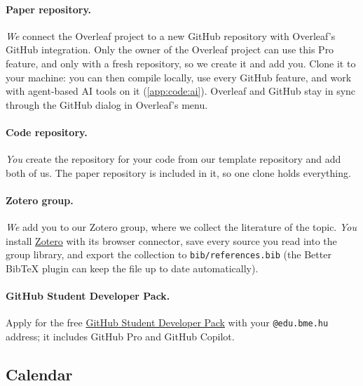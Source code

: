 \paragraph{Paper repository.} \emph{We} connect the Overleaf project to a new GitHub repository with Overleaf's GitHub integration. Only the owner of the Overleaf project can use this Pro feature, and only with a fresh repository, so we create it and add you. Clone it to your machine: you can then compile locally, use every GitHub feature, and work with agent-based AI tools on it (\cref{app:code:ai}). Overleaf and GitHub stay in sync through the GitHub dialog in Overleaf's menu.

\paragraph{Code repository.} \emph{You} create the repository for your code from our template repository and add both of us. The paper repository is included in it, so one clone holds everything.

\paragraph{Zotero group.} \emph{We} add you to our Zotero group, where we collect the literature of the topic. \emph{You} install \href{https://www.zotero.org/}{Zotero} with its browser connector, save every source you read into the group library, and export the collection to \texttt{bib/references.bib} (the Better BibTeX plugin can keep the file up to date automatically).

\paragraph{GitHub Student Developer Pack.} Apply for the free \href{https://education.github.com/pack}{GitHub Student Developer Pack} with your \texttt{@edu.bme.hu} address; it includes GitHub Pro and GitHub Copilot.

\subsection{Calendar}\label{app:start:calendar}
